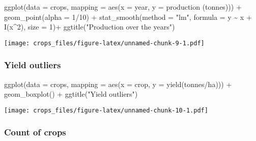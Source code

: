 \documentclass[
]{article}
\newenvironment{Shaded}{\begin{snugshade}}{\end{snugshade}}
\newcommand{\AttributeTok}[1]{\textcolor[rgb]{0.77,0.63,0.00}{#1}}
\newcommand{\DecValTok}[1]{\textcolor[rgb]{0.00,0.00,0.81}{#1}}
\newcommand{\FunctionTok}[1]{\textcolor[rgb]{0.00,0.00,0.00}{#1}}
\newcommand{\NormalTok}[1]{#1}
\newcommand{\SpecialCharTok}[1]{\textcolor[rgb]{0.00,0.00,0.00}{#1}}
\newcommand{\StringTok}[1]{\textcolor[rgb]{0.31,0.60,0.02}{#1}}
\begin{document}
\begin{Shaded}
\begin{Highlighting}[]
\FunctionTok{ggplot}\NormalTok{(}\AttributeTok{data =}\NormalTok{ crops, }\AttributeTok{mapping =} \FunctionTok{aes}\NormalTok{(}\AttributeTok{x =}\NormalTok{ year, }\AttributeTok{y =} \StringTok{\textasciigrave{}}\AttributeTok{production (tonnes)}\StringTok{\textasciigrave{}}\NormalTok{)) }\SpecialCharTok{+}
  \FunctionTok{geom\_point}\NormalTok{(}\AttributeTok{alpha =} \DecValTok{1}\SpecialCharTok{/}\DecValTok{10}\NormalTok{) }\SpecialCharTok{+}
  \FunctionTok{stat\_smooth}\NormalTok{(}\AttributeTok{method =} \StringTok{"lm"}\NormalTok{, }\AttributeTok{formula =}\NormalTok{ y }\SpecialCharTok{\textasciitilde{}}\NormalTok{ x }\SpecialCharTok{+} \FunctionTok{I}\NormalTok{(x}\SpecialCharTok{\^{}}\DecValTok{2}\NormalTok{), }\AttributeTok{size =} \DecValTok{1}\NormalTok{)}\SpecialCharTok{+}
  \FunctionTok{ggtitle}\NormalTok{(}\StringTok{"Production over the years"}\NormalTok{)}
\end{Highlighting}
\end{Shaded}

\texttt{[image: crops\_files/figure-latex/unnamed-chunk-9-1.pdf]}

\hypertarget{yield-outliers}{%
\subsubsection{Yield outliers}\label{yield-outliers}}

\begin{Shaded}
\begin{Highlighting}[]
\FunctionTok{ggplot}\NormalTok{(}\AttributeTok{data =}\NormalTok{ crops, }\AttributeTok{mapping =} \FunctionTok{aes}\NormalTok{(}\AttributeTok{x =}\NormalTok{ crop, }\AttributeTok{y =} \StringTok{\textasciigrave{}}\AttributeTok{yield(tonnes/ha)}\StringTok{\textasciigrave{}}\NormalTok{)) }\SpecialCharTok{+}
  \FunctionTok{geom\_boxplot}\NormalTok{() }\SpecialCharTok{+}
  \FunctionTok{ggtitle}\NormalTok{(}\StringTok{"Yield outliers"}\NormalTok{)}
\end{Highlighting}
\end{Shaded}

\texttt{[image: crops\_files/figure-latex/unnamed-chunk-10-1.pdf]}

\hypertarget{count-of-crops}{%
\subsubsection{Count of crops}\label{count-of-crops}}
\end{document}
